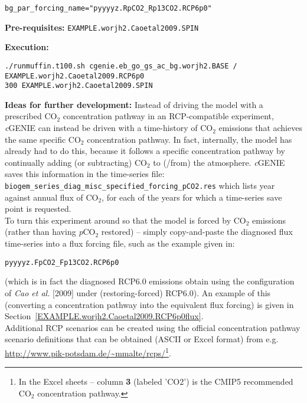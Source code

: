 \documentclass[10pt,twoside]{article}
\begin{document}
\vspace{-10pt}\begin{verbatim}
bg_par_forcing_name="pyyyyz.RpCO2_Rp13CO2.RCP6p0"
\end{verbatim}\vspace{-10pt}

\noindent \textbf{Pre-requisites:} \texttt{EXAMPLE.worjh2.Caoetal2009.SPIN}

\noindent \textbf{Execution:} 
\vspace{-10pt}\small\begin{verbatim}./runmuffin.t100.sh cgenie.eb_go_gs_ac_bg.worjh2.BASE / EXAMPLE.worjh2.Caoetal2009.RCP6p0  
300 EXAMPLE.worjh2.Caoetal2009.SPIN\end{verbatim}\normalsize\vspace{-10pt}

\noindent \textbf{Ideas for further development:}
Instead of driving the model with a prescribed CO$_{2}$ concentration pathway in an RCP-compatible experiment, \textit{c}GENIE can instead be driven with a time-history of CO$_{2}$ emissions that achieves the same specific CO$_{2}$ concentration pathway. In fact, internally, the model has already had to do this, because it follows a specific concentration pathway by continually adding (or subtracting) CO$_{2}$ to (/from) the atmosphere. \textit{c}GENIE saves this information in the time-series file:
\texttt{biogem\_series\_diag\_misc\_specified\_forcing\_pCO2.res}
which lists year against annual flux of CO$_{2}$, for each of the years for which a time-series save point is requested.
\\To turn this experiment around so that the model is forced by CO$_{2}$ emissions (rather than having \textit{p}CO$_{2}$ restored) -- simply copy-and-paste the diagnosed flux time-series into a flux forcing file, such as the example given in:
\vspace{-10pt}\begin{verbatim}
pyyyyz.FpCO2_Fp13CO2.RCP6p0
\end{verbatim}\vspace{-10pt}
(which is in fact the diagnosed RCP6.0 emissions obtain using the configuration of \textit{Cao et al.} [2009] under (restoring-forced) RCP6.0).
An example of this (converting a concentration pathway into the equivalent flux forcing) is given in Section~\ref{EXAMPLE.worjh2.Caoetal2009.RCP6p0flux}.
\\Additional RCP scenarios can be created using the official concentration pathway scenario definitions that can be obtained (ASCII or Excel format) from e.g. \url{http://www.pik-potsdam.de/~mmalte/rcps/}\footnote{In the Excel sheets -- column \textbf{3} (labeled 'CO2') is the CMIP5 recommended CO$_{2}$ concentration pathway.}.
\end{document}
